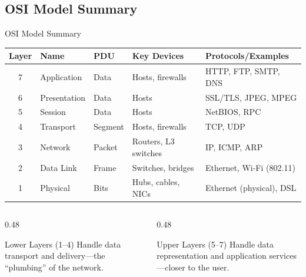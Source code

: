 \documentclass[aspectratio=169]{beamer}  %
\begin{document}
\subsection{OSI Model Summary}

\begin{frame}{OSI Model Summary}
    \begin{center}
        \small
        \begin{tabular}{c l l l l}
            \toprule
            \textbf{Layer} & \textbf{Name} & \textbf{PDU} & \textbf{Key Devices} & \textbf{Protocols/Examples} \\
            \midrule
            7 & Application & Data & Hosts, firewalls & HTTP, FTP, SMTP, DNS \\
            6 & Presentation & Data & Hosts & SSL/TLS, JPEG, MPEG \\
            5 & Session & Data & Hosts & NetBIOS, RPC \\
            \midrule
            4 & Transport & Segment & Hosts, firewalls & TCP, UDP \\
            \midrule
            3 & Network & Packet & Routers, L3 switches & IP, ICMP, ARP \\
            \midrule
            2 & Data Link & Frame & Switches, bridges & Ethernet, Wi-Fi (802.11) \\
            \midrule
            1 & Physical & Bits & Hubs, cables, NICs & Ethernet (physical), DSL \\
            \bottomrule
        \end{tabular}
    \end{center}
    
    \vspace{0.5em}
    \begin{columns}[T]
        \begin{column}{0.48\textwidth}
            \begin{block}{Lower Layers (1--4)}
                Handle data transport and delivery---the ``plumbing'' of the network.
            \end{block}
        \end{column}
        \begin{column}{0.48\textwidth}
            \begin{block}{Upper Layers (5--7)}
                Handle data representation and application services---closer to the user.
            \end{block}
        \end{column}
    \end{columns}
\end{frame}
\end{document}
